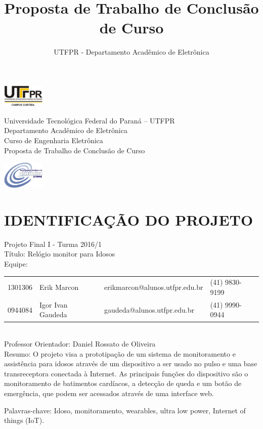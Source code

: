 \documentclass[a4paper]{article}
\title{Proposta de Trabalho de Conclusão de Curso}
\author{UTFPR - Departamento Acadêmico de Eletrônica}
\date{\the\year}
\begin{document}
\noindent
\includegraphics[width=0.15\textwidth]{figuras/UTFPR.png}
\begin{minipage}[b]{0.7\textwidth}
\centering
\Large{
Universidade Tecnológica Federal do Paraná – UTFPR\\
Departamento Acadêmico de Eletrônica\\
Curso de Engenharia Eletrônica \\
Proposta de Trabalho de Conclusão de Curso}
\end{minipage}
\includegraphics[width=0.15\textwidth]{figuras/daeln.jpg}

\section{IDENTIFICAÇÃO DO PROJETO}

Projeto Final I - Turma 2016/1 \\

Título: Relógio monitor para Idosos \\

Equipe:
\newline
	
\begin{tabular}{llll}
	1301306 & Erik Marcon & erikmarcon@alunos.utfpr.edu.br & (41) 9830-9199 \\
	0944084 & Igor Ivan Gaudeda & gaudeda@alunos.utfpr.edu.br & (41) 9990-0944
\end{tabular} \\

Professor Orientador: Daniel Rossato de Oliveira \\

Resumo: O projeto visa a prototipação de um sistema de monitoramento e assistência para idosos através de um dispositivo a ser usado no pulso e uma base transreceptora conectada à Internet. As principais funções do dispositivo são o monitoramento de batimentos cardíacos, a detecção de queda e um botão de emergência, que podem ser acessados através de uma interface web.

Palavras-chave: Idoso, monitoramento, wearables, ultra low power, Internet of things (IoT).
\end{document}
